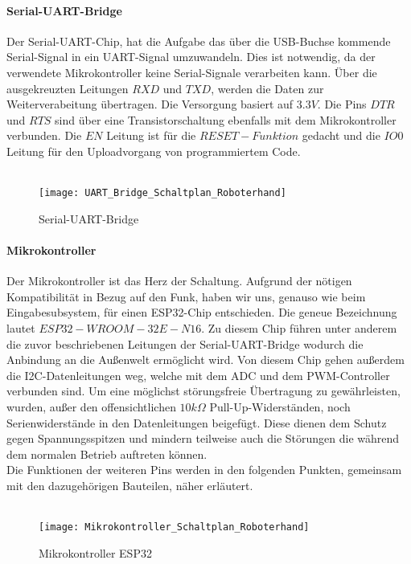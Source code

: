 \documentclass[titlepage,12pt,twoside]{article}
\begin{document}
\paragraph{Serial-UART-Bridge}
\hfill \break
\hfill \break
Der Serial-UART-Chip, hat die Aufgabe das über die USB-Buchse kommende Serial-Signal in ein UART-Signal umzuwandeln.
Dies ist notwendig, da der verwendete Mikrokontroller keine Serial-Signale verarbeiten kann. Über die ausgekreuzten
Leitungen $RXD$ und $TXD$, werden die Daten zur Weiterverabeitung übertragen. Die Versorgung basiert auf $3.3V$. Die Pins
$DTR$ und $RTS$ sind über eine Transistorschaltung ebenfalls mit dem Mikrokontroller verbunden. Die $EN$ Leitung ist für 
die $RESET-Funktion$ gedacht und die $IO0$ Leitung für den Uploadvorgang von programmiertem Code. \\
\\
\begin{figure}[H]
	\begin{center}
		\scalebox{0.6}
		{\texttt{[image: UART\_Bridge\_Schaltplan\_Roboterhand]}}
		\caption{Serial-UART-Bridge}
		\label{fig:UART_Bridge_Schaltplan_Roboterhand}	
	\end{center}
\end{figure}
\hfill \break
\newpage
\paragraph{Mikrokontroller}
\hfill \break
\hfill \break
Der Mikrokontroller ist das Herz der Schaltung. Aufgrund der nötigen Kompatibilität in Bezug auf den Funk, haben wir uns, genauso wie beim Eingabesubsystem, für einen ESP32-Chip entschieden.
Die geneue Bezeichnung lautet $ESP32-WROOM-32E-N16$. Zu diesem Chip führen unter anderem die zuvor beschriebenen Leitungen der Serial-UART-Bridge wodurch die Anbindung an die Außenwelt ermöglicht 
wird. Von diesem Chip gehen außerdem die I2C-Datenleitungen weg, welche mit dem ADC und dem PWM-Controller verbunden sind. Um eine möglichst störungsfreie Übertragung zu gewährleisten, wurden, außer 
den offensichtlichen $10k\Omega$ Pull-Up-Widerständen, noch Serienwiderstände in den Datenleitungen beigefügt. Diese dienen dem Schutz gegen Spannungsspitzen und mindern teilweise auch die Störungen
die während dem normalen Betrieb auftreten können. \\
Die Funktionen der weiteren Pins werden in den folgenden Punkten, gemeinsam mit den dazugehörigen Bauteilen, näher erläutert. \\
\\
\begin{figure}[H]
	\begin{center}
		\scalebox{0.6}
		{\texttt{[image: Mikrokontroller\_Schaltplan\_Roboterhand]}}
		\caption{Mikrokontroller ESP32}
		\label{fig:Mikrokontroller_Schaltplan_Roboterhand}	
	\end{center}
\end{figure}
\hfill \break
\newpage
\end{document}
